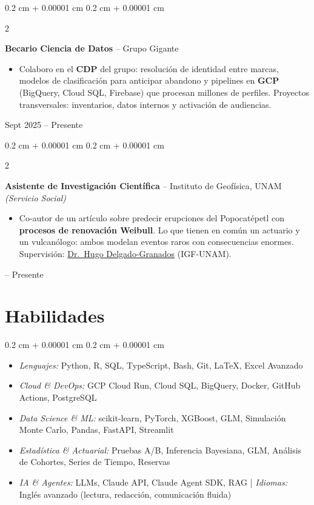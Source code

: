 \documentclass[10pt, letterpaper]{article}
\newenvironment{highlights}{
    \begin{itemize}[
        topsep=0.05 cm,
        parsep=0.05 cm,
        partopsep=0pt,
        itemsep=0pt,
        leftmargin=0.4 cm + 10pt
    ]
}{
    \end{itemize}
}
\newenvironment{highlightsforbulletentries}{
    \begin{itemize}[
        topsep=0.05 cm,
        parsep=0.05 cm,
        partopsep=0pt,
        itemsep=0pt,
        leftmargin=10pt
    ]
}{
    \end{itemize}
}
\newenvironment{onecolentry}{
    \begin{adjustwidth}{
        0.2 cm + 0.00001 cm
    }{
        0.2 cm + 0.00001 cm
    }
}{
    \end{adjustwidth}
}
\newenvironment{twocolentry}[2][]{
    \onecolentry
    \def\secondColumn{#2}
    \setcolumnwidth{\fill, 4.0 cm}
    \begin{paracol}{2}
}{
    \switchcolumn \raggedleft \secondColumn
    \end{paracol}
    \endonecolentry
}
\let\hrefWithoutArrow\href
\renewcommand{\href}[2]{\hrefWithoutArrow{#1}{\ifthenelse{\equal{#2}{}}{ }{#2 }\raisebox{.15ex}{\footnotesize \faExternalLink*}}}
\begin{document}
        \begin{twocolentry}{Sept 2025 -- Presente}
            \textbf{Becario Ciencia de Datos} -- Grupo Gigante
            \begin{highlights}
                \item Colaboro en el \textbf{CDP} del grupo: resolución de identidad entre marcas, modelos de clasificación para anticipar abandono y pipelines en \textbf{GCP} (BigQuery, Cloud SQL, Firebase) que procesan millones de perfiles. Proyectos transversales: inventarios, datos internos y activación de audiencias.
            \end{highlights}
        \end{twocolentry}

        \vspace{0.05 cm}

        \begin{twocolentry}{2025 -- Presente}
            \textbf{Asistente de Investigación Científica} -- Instituto de Geofísica, UNAM \textit{(Servicio Social)}
            \begin{highlights}
                \item Co-autor de un artículo sobre predecir erupciones del Popocatépetl con \textbf{procesos de renovación Weibull}. Lo que tienen en común un actuario y un vulcanólogo: ambos modelan eventos raros con consecuencias enormes. Supervisión: \hrefWithoutArrow{https://scholar.google.com/citations?user=lDD0DZQAAAAJ}{Dr.\ Hugo Delgado-Granados} (IGF-UNAM).
            \end{highlights}
        \end{twocolentry}


    \section{Habilidades}

\begin{onecolentry}
    \begin{highlightsforbulletentries}
        \item \textit{Lenguajes:} Python, R, SQL, TypeScript, Bash, Git, \LaTeX, Excel Avanzado
        \item \textit{Cloud \& DevOps:} GCP Cloud Run, Cloud SQL, BigQuery, Docker, GitHub Actions, PostgreSQL
        \item \textit{Data Science \& ML:} scikit-learn, PyTorch, XGBoost, GLM, Simulación Monte Carlo, Pandas, FastAPI, Streamlit
        \item \textit{Estadística \& Actuarial:} Pruebas A/B, Inferencia Bayesiana, GLM, Análisis de Cohortes, Series de Tiempo, Reservas
        \item \textit{IA \& Agentes:} LLMs, Claude API, Claude Agent SDK, RAG | \textit{Idiomas:} Inglés avanzado (lectura, redacción, comunicación fluida)
    \end{highlightsforbulletentries}
\end{onecolentry}
\end{document}

